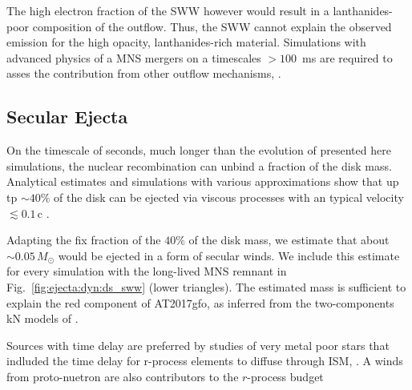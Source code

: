 
The high electron fraction of the \ac{SWW} however would result in a lanthanides-poor
composition of the outflow. Thus, the \ac{SWW} cannot explain the observed emission 
for the high opacity, lanthanides-rich material.
Simulations with advanced physics of a \ac{MNS} mergers on a timescales $>100$~ms are 
required to asses the contribution from other outflow mechanisms,  
\citep{Lee:2009uc,Fernandez:2015use,Siegel:2017nub,Fujibayashi:2017puw,Fernandez:2018kax,Radice:2018xqa}.


\subsection{Secular Ejecta}


On the timescale of seconds, much longer than the evolution of 
presented here simulations, the nuclear recombination can unbind 
a fraction of the disk mass. 
Analytical estimates and simulations with various approximations show that up tp ${\sim}40\%$ of the disk can be ejected via viscous processes with an typical velocity ${\lesssim}0.1\,$c
\citep{Lee:2009uc,Fernandez:2015use,Wu:2016pnw,Siegel:2017nub,Fujibayashi:2017puw,Fernandez:2018kax,Radice:2018xqa,Fujibayashi:2020dvr}.

Adapting the fix fraction of the $40\%$ of the disk mass, we estimate 
that about  ${\sim}0.05\, M_{\odot}$ would be ejected in a form of 
secular winds. We include this estimate for every simulation
with the long-lived \ac{MNS} remnant in Fig.~\ref{fig:ejecta:dyn:ds_sww} (lower triangles).
The estimated mass is sufficient to explain
the red component of AT2017gfo, as inferred from the two-components kN
models of \cite{Villar:2017wcc}. 







Sources with time delay are preferred by studies of very metal poor stars that indluded the time delay for r-process elements
to diffuse through ISM, \citep{Tarumi:2021xvw}. 
A winds from proto-nuetron are also contributors to the $r$-process budget \cite{Vincenzo:2021rvw}

